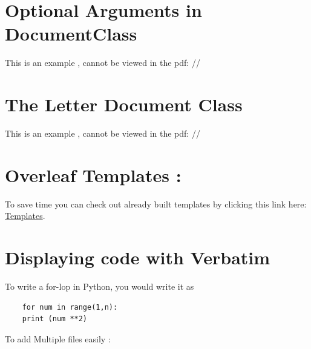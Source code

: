 \documentclass{report}
\theoremstyle{plain} %
\begin{document}
\newpage
\section{Optional Arguments in DocumentClass}
This is an example , cannot be viewed in the pdf: //

\section{The Letter Document Class}
This is an example , cannot be viewed in the pdf: //

\section{Overleaf Templates :}
To save time you can check out already built templates by clicking this link here: \href{https://www.overleaf.com/latex/templates}{Templates}.

\section{Displaying code with Verbatim}
To write a for-lop in Python, you would write it as 
\begin{verbatim}
    for num in range(1,n):
    print (num **2)
\end{verbatim}



To add Multiple files easily :

\end{document}
